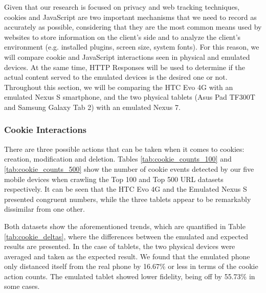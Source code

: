 \documentclass{acm_proc_article-sp}
\begin{document}
Given that our research is focused on privacy and web tracking techniques, cookies and JavaScript are two important mechanisms that we need to record as accurately as possible, considering that they are the most common means used by websites to store information on the client's side and to analyze the client's environment (e.g. installed plugins, screen size, system fonts). For this reason, we will compare cookie and JavaScript interactions seen in physical and emulated devices. At the same time, HTTP Responses will be used to determine if the actual content served to the emulated devices is the desired one or not. Throughout this section, we will be comparing the HTC Evo 4G with an emulated Nexus S smartphone, and the two physical tablets (Asus Pad TF300T and Samsung Galaxy Tab 2) with an emulated Nexus 7.

\subsubsection{Cookie Interactions}

There are three possible actions that can be taken when it comes to cookies: creation, modification and deletion. Tables \ref{tab:cookie_counts_100} and \ref{tab:cookie_counts_500} show the number of cookie events detected by our five mobile devices when crawling the Top 100 and Top 500 URL datasets respectively. It can be seen that the HTC Evo 4G and the Emulated Nexus S presented congruent numbers, while the three tablets appear to be remarkably dissimilar from one other.

Both datasets show the aforementioned trends, which are quantified in Table \ref{tab:cookie_deltas}, where the differences between the emulated and expected results are presented. In the case of tablets, the two physical devices were averaged and taken as the expected result. We found that the emulated phone only distanced itself from the real phone by 16.67\% or less in terms of the cookie action counts. The emulated tablet showed lower fidelity, being off by 55.73\% in some cases.
\end{document}
